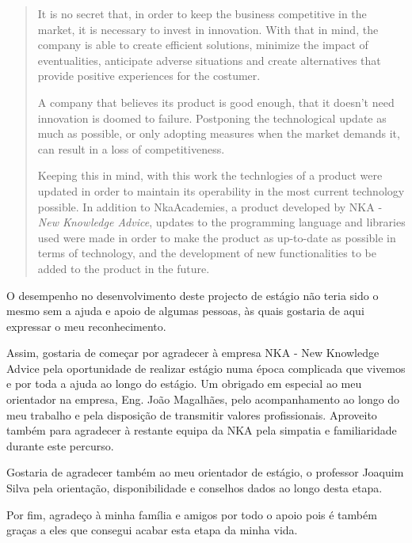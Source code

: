 \documentclass[a4paper,12pt,twoside]{book}
\begin{document}
\begin{abstract}

\par It is no secret that, in order to keep the business competitive in the market, it is necessary to invest in innovation. With that in mind, the company is able to create efficient solutions, minimize the impact of eventualities, anticipate adverse situations and create alternatives that provide positive experiences for the costumer.
\par A company that believes its product is good enough, that it doesn't need innovation is doomed to failure. Postponing the technological update as much as possible, or only adopting measures when the market demands it, can result in a loss of competitiveness.
\par Keeping this in mind, with this work the technlogies of a product were updated in order to maintain its operability in the most current technology possible. In addition to NkaAcademies, a product developed by NKA - \textit{New Knowledge Advice}, updates to the programming language and libraries used were made in order to make the product as up-to-date as possible in terms of technology, and the development of new functionalities to be added to the product in the future.
\end{abstract}

\begin{agradecimentos}
\par O desempenho no desenvolvimento deste projecto de estágio não teria sido o mesmo sem a ajuda e apoio de algumas pessoas, às quais gostaria de aqui expressar o meu reconhecimento.
\par Assim, gostaria de começar por agradecer à empresa NKA - New Knowledge Advice pela oportunidade de realizar estágio numa época complicada que vivemos e por toda a ajuda ao longo do estágio. Um obrigado em especial ao meu orientador na empresa, Eng. João Magalhães, pelo acompanhamento ao longo do meu trabalho e pela disposição de transmitir valores profissionais. Aproveito também para agradecer à restante equipa da NKA pela simpatia e familiaridade durante este percurso.
\par Gostaria de agradecer também ao meu orientador de estágio, o professor Joaquim Silva pela orientação, disponibilidade e conselhos dados ao longo desta etapa.
\par Por fim, agradeço à minha família e amigos por todo o apoio pois é também graças a eles que consegui acabar esta etapa da minha vida.
\end{agradecimentos}
\end{document}
